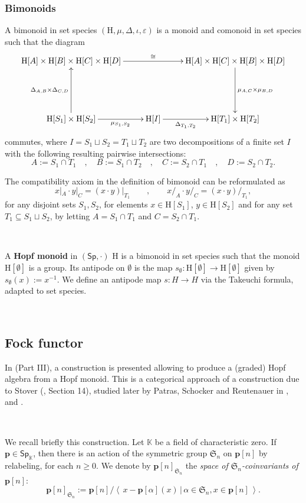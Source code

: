 \documentclass[12pt, reqno]{amsart}
\theoremstyle{definition}
\newcommand{\Ss}{\mathsf{Sp}} %
\newcommand{\Ssk}{\mathsf{Sp}_\Kb} %
\newcommand{\Kb}{\mathbb{K}}
\newcommand{\rH}{\mathrm{H}}
\newcommand{\tp}{\mathbf{p}}
\begin{document}
\subsubsection{Bimonoids}
A bimonoid in set species $(\rH, \mu, \Delta, \iota, \varepsilon)$ is a monoid and comonoid in set species such that the diagram
\[\xymatrix{
\rH[A] \times \rH[B] \times\rH[C] \times \rH[D] \ar[rr]^-{\cong} && \rH[A] \times \rH[C] \times \rH[B] \times \rH[D] \ar[dd]^-{\mu_{A,C}\times\mu_{B,D}}\\
&&\\
\rH[S_1]\times \rH[S_2]\ar[uu]^-{\Delta_{A,B}\times \Delta_{C,D}} \ar[r]_-{\mu_{S_1, S_2}} & \rH[I] \ar[r]_-{\Delta_{T_1, T_2}} & \rH[T_1]\times \rH[T_2]
}\]
commutes, where $I=S_1\sqcup S_2=T_1 \sqcup T_2$ are two decompositions of a finite set $I$ with the following resulting pairwise intersections:
\[A:=S_1\cap T_1 \quad , \quad B:=S_1 \cap T_2 \quad , \quad C:=S_2 \cap T_1 \quad , \quad D:=S_2 \cap T_2.\]

The compatibility axiom in the definition of bimonoid can be reformulated as
\[x|_A \cdot y|_C= (x\cdot y)|_{T_1} \qquad , \qquad x/_A \cdot y/_C=(x \cdot y)/_{T_1},\]
for any disjoint sets $S_1, S_2$, for elements $x \in \rH[S_1]$, $y\in \rH[S_2]$ and for any set $T_1\subseteq S_1 \sqcup S_2$, by letting $A= S_1 \cap T_1$ and $C= S_2\cap T_1$.

\

A {\bf Hopf monoid} in $(\Ss, \cdot)$ $\rH$ is a bimonoid in set species such that the monoid $\rH[\emptyset]$ is a group.
Its antipode on $\emptyset $ is the map $s_\emptyset: \rH[\emptyset]\to \rH[\emptyset]$ given by $s_\emptyset(x):=x^{-1}$.
We define an antipode map $s: H\to H$ via the Takeuchi formula, adapted to set species.


\

\subsection{Fock functor}
In \cite{AM2010} (Part III), a construction is presented allowing to produce a (graded) Hopf algebra from a Hopf monoid. This is a categorical approach of a construction due to Stover (\cite{Stover}, Section 14), studied later by Patras, Schocker and Reutenauer in \cite{PR2004}, \cite{PS2006} and \cite{PS2008}.

\

We recall briefly this construction. Let $\mathbb{K}$ be a field of characteristic zero. If $\tp \in \Ssk$, then there is an action of the symmetric group $\mathfrak{S}_n$ on $\tp[n]$ by relabeling, for each $n \geq 0$. We denote by $\tp[n]_{\mathfrak{S}_n}$ the \emph{space of $\mathfrak{S}_n$-coinvariants of $\tp[n]$}:
\begin{equation}
  \tp[n]_{\mathfrak{S}_n}:=\tp[n]/\left\langle \, x- \tp[\alpha](x) \, | \, \alpha \in \mathfrak{S}_n, x\in \tp[n] \,\right\rangle.
\end{equation}
\end{document}
